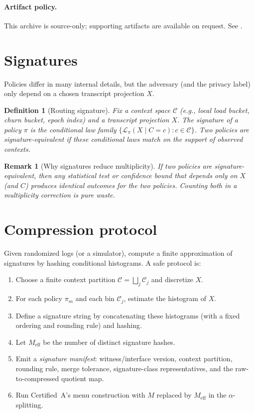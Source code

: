\documentclass[11pt]{article}
\newtheorem{definition}{Definition}
\newtheorem{remark}{Remark}
\begin{document}
\paragraph{Artifact policy.}
This archive is source-only; supporting artifacts are available on request. See \cite{series:artifactpolicy}.

\section{Signatures}
Policies differ in many internal details, but the adversary (and the privacy label) only depend on a chosen transcript projection $X$.

\begin{definition}[Routing signature]
Fix a context space $\mathcal C$ (e.g., local load bucket, churn bucket, epoch index) and a transcript projection $X$.
The \emph{signature} of a policy $\pi$ is the conditional law family $\{\mathcal L_\pi(X\mid C=c): c\in\mathcal C\}$.
Two policies are signature-equivalent if these conditional laws match on the support of observed contexts.
\end{definition}

\begin{remark}[Why signatures reduce multiplicity]
If two policies are signature-equivalent, then any statistical test or confidence bound that depends only on $X$ (and $C$) produces identical outcomes for the two policies.
Counting both in a multiplicity correction is pure waste.
\end{remark}

\section{Compression protocol}
Given randomized logs (or a simulator), compute a finite approximation of signatures by hashing conditional histograms.
A safe protocol is:
\begin{enumerate}[leftmargin=*]
\item Choose a finite context partition $\mathcal C=\bigsqcup_j \mathcal C_j$ and discretize $X$.
\item For each policy $\pi_m$ and each bin $\mathcal C_j$, estimate the histogram of $X$.
\item Define a signature string by concatenating these histograms (with a fixed ordering and rounding rule) and hashing.
\item Let $M_{\mathrm{eff}}$ be the number of distinct signature hashes.
\item Emit a \emph{signature manifest}: witness/interface version, context partition, rounding rule, merge tolerance, signature-class representatives, and the raw-to-compressed quotient map.
\item Run Certified~A's menu construction with $M$ replaced by $M_{\mathrm{eff}}$ in the $\alpha$-splitting.
\end{enumerate}
\end{document}
